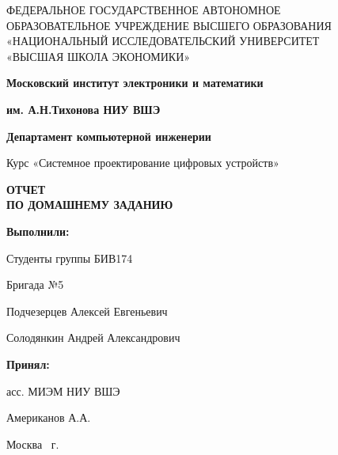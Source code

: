 \begin{titlepage}
    \begin{center}
        ФЕДЕРАЛЬНОЕ ГОСУДАРСТВЕННОЕ АВТОНОМНОЕ \\
        ОБРАЗОВАТЕЛЬНОЕ УЧРЕЖДЕНИЕ ВЫСШЕГО ОБРАЗОВАНИЯ\\
        «НАЦИОНАЛЬНЫЙ ИССЛЕДОВАТЕЛЬСКИЙ УНИВЕРСИТЕТ\\
        «ВЫСШАЯ ШКОЛА ЭКОНОМИКИ»
    \end{center}

    \begin{center}
        \textbf{Московский институт электроники и математики}

        \textbf{им. А.Н.Тихонова НИУ ВШЭ}

        \vspace{2ex}

        \textbf{Департамент компьютерной инженерии}
    \end{center}
    \vspace{1ex}

    \begin{center}
        Курс «Системное проектирование цифровых устройств»
    \end{center}


    \begin{center}
        \textbf{ОТЧЕТ\\
        ПО ДОМАШНЕМУ ЗАДАНИЮ
        }
    \end{center}


    \vspace{2ex}

    \begin{flushright}
        \textbf{Выполнили:}

        \vspace{2ex}

        Студенты группы БИВ174

        Бригада №5

        \vspace{2ex}

        Подчезерцев Алексей Евгеньевич

        Солодянкин Андрей Александрович
        \vspace{2ex}

        \textbf{Принял:}

        асс. МИЭМ НИУ ВШЭ

        Американов А.А.

    \end{flushright}

    \vfill
    \begin{center}
        Москва \the\year \, г.
    \end{center}

\end{titlepage}
\addtocounter{page}{1}